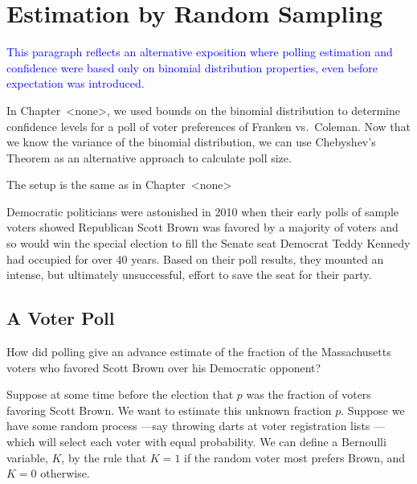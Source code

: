 
\section{Estimation by Random Sampling}

\begin{editingnotes}

\textcolor{blue}{This paragraph reflects an alternative exposition
  where polling estimation and confidence were based only on binomial
  distribution properties, even before expectation was introduced.}

In Chapter~<none>, we used bounds on the binomial distribution to determine
confidence levels for a poll of voter preferences of Franken vs.\ Coleman.
Now that we know the variance of the binomial distribution, we can use
Chebyshev's Theorem as an alternative approach to calculate poll size.

The setup is the same as in Chapter~<none>
\end{editingnotes}

Democratic politicians were astonished in 2010 when their early polls of
sample voters showed Republican Scott Brown was favored by a majority
of voters and so would win the special election to fill the Senate
seat Democrat Teddy Kennedy had occupied for over 40 years.  Based on
their poll results, they mounted an intense, but ultimately
unsuccessful, effort to save the seat for their party.

\iffalse
\footnote{We can only keep our fingers crossed for this race to happen --
when they ran against each other for the U.S. Senate in 2000, they
generated some of the best entertainment in TV history.}  \fi

\subsection{A Voter Poll}
How did polling give an advance estimate of the fraction of the
Massachusetts voters who favored Scott Brown over his Democratic
opponent?

Suppose at some time before the election that $p$ was the fraction of
voters favoring Scott Brown.  We want to estimate this unknown
fraction $p$.   Suppose we have some random
process ---say throwing darts at voter registration lists ---which
will select each voter with equal probability.  We can define a
Bernoulli variable, $K$, by the rule that $K=1$ if the random voter
most prefers Brown, and $K=0$ otherwise.

